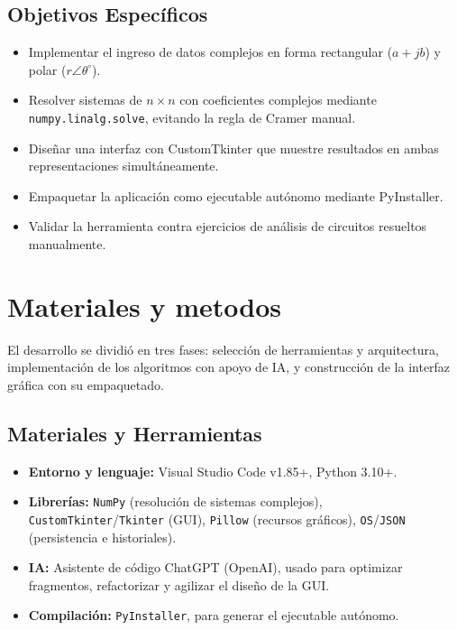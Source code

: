 \documentclass[11pt,a4paper]{article}
\begin{document}
\subsection*{Objetivos Específicos}
\begin{itemize}
    \item Implementar el ingreso de datos complejos en forma rectangular ($a+jb$) y polar ($r\angle\theta^\circ$).
    \item Resolver sistemas de $n \times n$ con coeficientes complejos mediante \texttt{numpy.linalg.solve}, evitando la regla de Cramer manual.
    \item Diseñar una interfaz con CustomTkinter que muestre resultados en ambas representaciones simultáneamente.
    \item Empaquetar la aplicación como ejecutable autónomo mediante PyInstaller.
    \item Validar la herramienta contra ejercicios de análisis de circuitos resueltos manualmente.
\end{itemize}

\section{Materiales y metodos}

El desarrollo se dividió en tres fases: selección de herramientas y arquitectura, implementación de los algoritmos con apoyo de IA, y construcción de la interfaz gráfica con su empaquetado.

\subsection*{Materiales y Herramientas}
\begin{itemize}
    \item \textbf{Entorno y lenguaje:} Visual Studio Code v1.85+, Python 3.10+.
    \item \textbf{Librerías:} \texttt{NumPy} (resolución de sistemas complejos), \texttt{CustomTkinter}/\texttt{Tkinter} (GUI), \texttt{Pillow} (recursos gráficos), \texttt{OS}/\texttt{JSON} (persistencia e historiales).
    \item \textbf{IA:} Asistente de código ChatGPT (OpenAI), usado para optimizar fragmentos, refactorizar y agilizar el diseño de la GUI.
    \item \textbf{Compilación:} \texttt{PyInstaller}, para generar el ejecutable autónomo.
\end{itemize}
\end{document}
